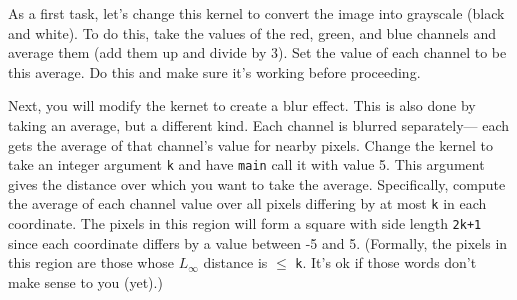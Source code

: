 \documentclass{article}
\begin{document}
As a first task, let's change this kernel to convert the image into 
grayscale (black and white).
To do this, take the values of the red, green, and blue channels and
average them (add them up and divide by 3).
Set the value of each channel to be this average.
Do this and make sure it's working before proceeding.

Next, you will modify the kernet to create a blur effect.
This is also done by taking an average, but a different kind.
Each channel is blurred separately--- each gets the average of that
channel's value for nearby pixels.
Change the kernel to take an integer argument {\tt k} and have {\tt main}
call it with value 5.
This argument gives the distance over which you want to take the
average.
Specifically, compute the average of each channel value over all
pixels differing by at most {\tt k} in each coordinate.
The pixels in this region will form a square with side length
{\tt 2k+1} since each coordinate differs by a value between -5 and 5.
(Formally, the pixels in this region are those whose $L_\infty$
 distance is $\leq$ {\tt k}.
 It's ok if those words don't make sense to you (yet).)
\end{document}
